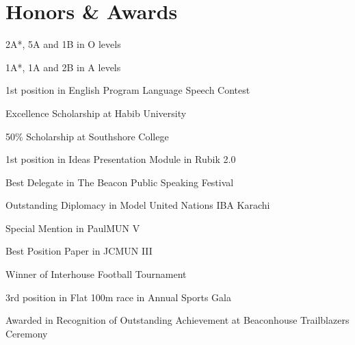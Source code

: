 \documentclass[]{deedy-resume-openfont}
\begin{document}
\section{Honors \& Awards}
\vspace{4pt}
\begin{tightemize}
\item 2A*, 5A and 1B in O levels\\
\item 1A*, 1A and 2B in A levels\\
\item 1st position in English Program Language Speech Contest\\
\item Excellence Scholarship at Habib University\\
\item 50\% Scholarship at Southshore College\\
\item 1st position in Ideas Presentation Module in Rubik 2.0\\
\item Best Delegate in The Beacon Public Speaking Festival\\
\item Outstanding Diplomacy in Model United Nations IBA Karachi\\
\item Special Mention in PaulMUN V\\
\item Best Position Paper in JCMUN III\\
\item Winner of Interhouse Football Tournament\\
\item 3rd position in Flat 100m race in Annual Sports Gala\\
\item Awarded in Recognition of Outstanding Achievement at Beaconhouse Trailblazers Ceremony\\
\end{tightemize}
      \ 
      
\end{document}
